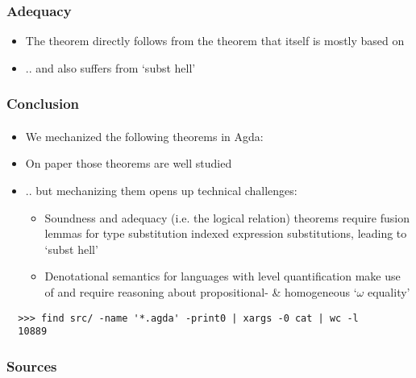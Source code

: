 \documentclass[dvipsnames,aspectratio=169,pdftex]{beamer}
\begin{document}
\begin{frame}[fragile]
  \frametitle{Adequacy}
  \FundamentalAdequacyType
  \vspace{-12.5mm} 
  \FundamentalAdequacyBody
  \begin{itemize}
    \item The  theorem directly follows from the  theorem that itself is mostly based on \cite{DBLP:journals/corr/abs-1907-11133,ahmed23:_oplss}
    \item .. and also suffers from `subst hell'
  \end{itemize}
\end{frame}


\begin{frame}[fragile]
  \frametitle{Conclusion}
  \framesubtitle{}
  \begin{itemize}
    \item We mechanized the following theorems in Agda: 
  \end{itemize}
  \begin{itemize} 
    \item On paper those theorems are well studied
    \item .. but mechanizing them opens up technical challenges:
    \begin{itemize} 
      \item Soundness and adequacy (i.e. the logical relation) theorems require fusion lemmas for type substitution indexed expression substitutions, leading to `subst hell'
      \item Denotational semantics for languages with level quantification make use of  and require reasoning about propositional- \& homogeneous `$\omega$ equality'
    \end{itemize}
  \end{itemize}
  \begin{verbatim} 
  >>> find src/ -name '*.agda' -print0 | xargs -0 cat | wc -l
  10889
  \end{verbatim}
\end{frame}

\begin{frame}[fragile]
  \frametitle{Sources}  
   
  
\end{frame}
\end{document}
